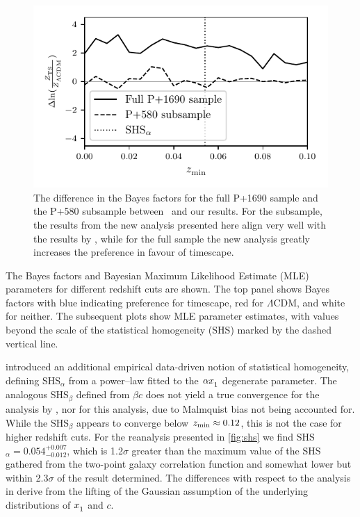 \documentclass[fleqn,usenatbib]{mnras}
\newcommand{\LA}{\Lambda}
\newcommand{\LCDM}{$\LA$CDM}
\newcommand{\laneetal}{\citet{Lane_2023}}
\newcommand{\Z}[1]{_{\lower2pt\hbox{$\scriptstyle#1$}}}
\newcommand{\ns}[1]{_{\rm #1}}
\newcommand{\zmin}{z\ns{min}}
\begin{document}
\begin{figure}
    \includegraphics[width=\columnwidth]{images/residuals.pdf}
    \caption{The difference in the Bayes factors for the full P+1690 sample and the P+580 subsample between \laneetal\ and our results. For the subsample, the results from the new analysis presented here align very well with the results by \laneetal, while for the full sample the new analysis greatly increases the preference in favour of timescape.}
    \label{fig:results580}
\end{figure}

The Bayes factors and Bayesian Maximum Likelihood Estimate (MLE) parameters for different redshift cuts are shown. The top panel shows Bayes factors with blue indicating preference for timescape, red for \LCDM, and white for neither. The subsequent plots show MLE parameter estimates, with values beyond the scale of the statistical homogeneity (SHS) marked by the dashed vertical line.

\citet{Lane_2023} introduced an additional empirical data-driven notion of statistical homogeneity, defining SHS$_\alpha$ from a power--law fitted to the $\alpha x \Z 1$ degenerate parameter. The analogous SHS$_\beta$ defined from $\beta c$ does not yield a true convergence for the analysis by \citet{Lane_2023}, nor for this analysis, due to Malmquist bias not being accounted for. While the SHS$_\beta$ appears to converge below $\zmin \approx 0.12$, this is not the case for higher redshift cuts. For the reanalysis presented in \cref{fig:shs} we find SHS$_\alpha = 0.054_{-0.012}^{+0.007}$, which is 1.2$\sigma$ greater than the maximum value of the SHS gathered from the two-point galaxy correlation function \citep{Hogg_2005, Scrimgeour_2012} and somewhat lower but within 2.3$\sigma$ of the result \citet{Lane_2023} determined. The differences with respect to the analysis in \citet{Lane_2023} derive from the lifting of the Gaussian assumption of the underlying distributions of $x\Z1$ and $c$.
\end{document}
